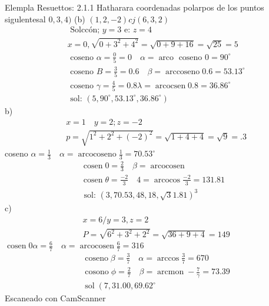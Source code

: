 

Elempla Resuettos:
2.1.1 Hatharara coordenadas polarpos de los puntos sigulentesal $0,3,4)$ (b) $(1,2,-2) c j(6,3,2)$
$$
\begin{aligned}
	& \text { Solccón; } y=3 \text { e: } z=4 \\
	& x=0, \sqrt{0+3^2+4^2}=\sqrt{0+9+16}=\sqrt{25}=5 \\
	& \text { coseno } \alpha=\frac{0}{5}=0 \quad \alpha=\operatorname{arco} \text { coseno } 0=90^{\circ} \\
	& \text { coseno } B=\frac{3}{5}=0.6 \quad \beta=\operatorname{arccoseno} 0.6=53.13^{\circ} \\
	& \text { coseno } \gamma=\frac{4}{5}=0.8 \lambda=\operatorname{arcocsen} 0.8=36.86^{\circ} \\
	& \text { sol: }\left(5,90^{\circ}, 53.13^{\circ}, 36.86^{\circ}\right)
\end{aligned}
$$
b)
$$
\begin{aligned}
	& x=1 \quad y=2 ; z=-2 \\
	& p=\sqrt{1^2+2^2+(-2)^2}=\sqrt{1+4+4}=\sqrt{9}=.3
\end{aligned}
$$
coseno $\alpha=\frac{1}{3} \quad \alpha=\operatorname{arcocoseno} \frac{1}{3}=70.53^{\circ}$
$$
\begin{gathered}
	\operatorname{cosen} 0=\frac{2}{3} \quad \beta=\operatorname{arcocosen} \\
	\operatorname{cosen} \theta=\frac{-2}{3} \quad 4=\operatorname{arcocos} \frac{-2}{3}=131.81 \\
	\text { sol: }(3,70.53,48,18, \sqrt{3} 1.81)^3
\end{gathered}
$$
c)
$$
\begin{aligned}
	& x=6 / y=3, z=2 \\
	& P=\sqrt{6^2+3^2+2^2}=\sqrt{36+9+4}=149
\end{aligned}
$$
$\operatorname{cosen} 0 \alpha=\frac{6}{7} \quad \alpha=\operatorname{arcocosen} \frac{6}{7}=316$
$$
\begin{aligned}
	& \operatorname{coseno} \beta=\frac{3}{7} \quad \alpha=\arccos \frac{3}{7}=670 \\
	& \operatorname{cosono} \phi=\frac{2}{7} \quad \beta=\operatorname{arcmon}-\frac{7}{\gamma}=73.39 \\
	& \operatorname{sol}\left(7,31.00,69.62^{\circ}\right.
\end{aligned}
$$
Escaneado con CamScanner




